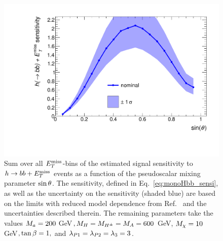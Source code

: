 \begin{figure}[tbp]
\centering
\includegraphics[width=\textwidth]{texinputs/04_grid/figures/monoHbb_sinp_scan_1_sensi_1D.pdf}
\caption[Sensitivity to $h\rightarrow bb + \MET$ signals with different $\sinp$, summed across $\MET$ bins]
{
Sum over all $\MET$-bins of the estimated signal sensitivity to $h\rightarrow bb + \MET$ events as a function of the pseudoscalar mixing parameter $\sinp$. 
The sensitivity, defined in Eq.~\ref{eq:monoHbb_sensi}, as well as the uncertainty on the sensitivity (shaded blue) 
 are based on the limits with reduced model dependence from Ref.~\cite{Aaboud:2017yqz} and the uncertainties described therein. 
The remaining parameters take the values
$ M_{a} = 200 $ GeV$, M_{H}=M_{H^{\pm}}=M_{A} = 600$ GeV, $M_{\chi} = 10 $ GeV$, \tan\beta = 1,$ and $ \lambda_{P1} = \lambda_{P2} = \lambda_{3} = 3 $.}
\label{fig:monoHbb_sensi_full_sinp_1}
\end{figure}


